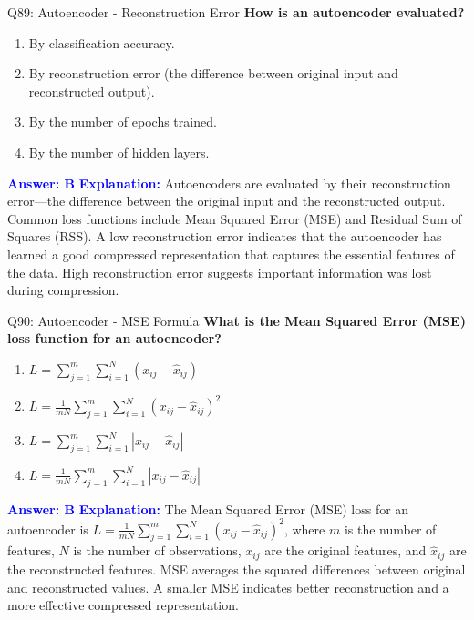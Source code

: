 \documentclass[8pt]{beamer}
\begin{document}
	\begin{frame}{Q89: Autoencoder - Reconstruction Error}
		\fontsize{6.5}{7.5}\selectfont
		\textbf{How is an autoencoder evaluated?}
		\begin{enumerate}
			\item By classification accuracy.
			\item By reconstruction error (the difference between original input and reconstructed output).
			\item By the number of epochs trained.
			\item By the number of hidden layers.
		\end{enumerate}
		\vspace{0.1cm}
		\textcolor{blue}{\textbf{Answer: B}}
		\vspace{0.1cm}
		\textcolor{blue}{\textbf{Explanation:}} Autoencoders are evaluated by their reconstruction error—the difference between the original input and the reconstructed output. Common loss functions include Mean Squared Error (MSE) and Residual Sum of Squares (RSS). A low reconstruction error indicates that the autoencoder has learned a good compressed representation that captures the essential features of the data. High reconstruction error suggests important information was lost during compression.
	\end{frame}
	
	\begin{frame}{Q90: Autoencoder - MSE Formula}
		\fontsize{6.5}{7.5}\selectfont
		\textbf{What is the Mean Squared Error (MSE) loss function for an autoencoder?}
		\begin{enumerate}
			\item $L = \sum_{j=1}^m \sum_{i=1}^N (x_{ij} - \hat{x}_{ij})$
			\item $L = \frac{1}{mN} \sum_{j=1}^m \sum_{i=1}^N (x_{ij} - \hat{x}_{ij})^2$
			\item $L = \sum_{j=1}^m \sum_{i=1}^N |x_{ij} - \hat{x}_{ij}|$
			\item $L = \frac{1}{mN} \sum_{j=1}^m \sum_{i=1}^N |x_{ij} - \hat{x}_{ij}|$
		\end{enumerate}
		\vspace{0.1cm}
		\textcolor{blue}{\textbf{Answer: B}}
		\vspace{0.1cm}
		\textcolor{blue}{\textbf{Explanation:}} The Mean Squared Error (MSE) loss for an autoencoder is $L = \frac{1}{mN} \sum_{j=1}^m \sum_{i=1}^N (x_{ij} - \hat{x}_{ij})^2$, where $m$ is the number of features, $N$ is the number of observations, $x_{ij}$ are the original features, and $\hat{x}_{ij}$ are the reconstructed features. MSE averages the squared differences between original and reconstructed values. A smaller MSE indicates better reconstruction and a more effective compressed representation.
	\end{frame}
	
\end{document}

